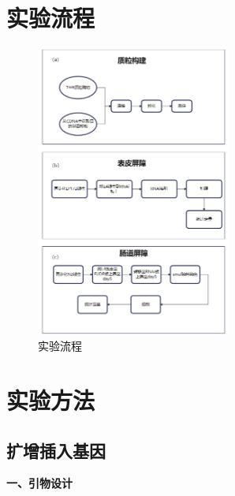 \section{实验流程}

\begin{figure}[H]
  \centering
  \includegraphics[width=0.57\textwidth]{img/flow_chart.png}
  \caption{实验流程}
  \label{fig:flow_chart}
\end{figure}

\section{实验方法}

\subsection{扩增插入基因}

\textbf{一、引物设计}

